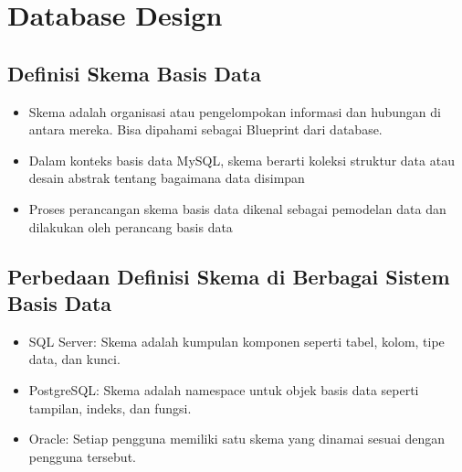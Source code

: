 \documentclass{article}
\begin{document}
\section{Database Design}
\subsection{Definisi Skema Basis Data}
\begin{itemize}
    \item Skema adalah organisasi atau pengelompokan informasi dan hubungan di antara mereka. Bisa dipahami sebagai Blueprint dari database.
    \item Dalam konteks basis data MySQL, skema berarti koleksi struktur data atau desain abstrak tentang bagaimana data disimpan
    \item Proses perancangan skema basis data dikenal sebagai pemodelan data dan dilakukan oleh perancang basis data
\end{itemize}

\subsection{Perbedaan Definisi Skema di Berbagai Sistem Basis Data}
\begin{itemize}
    \item SQL Server: Skema adalah kumpulan komponen seperti tabel, kolom, tipe data, dan kunci.
    \item PostgreSQL\@: Skema adalah namespace untuk objek basis data seperti tampilan, indeks, dan fungsi.
    \item Oracle: Setiap pengguna memiliki satu skema yang dinamai sesuai dengan pengguna tersebut.
\end{itemize}
\end{document}
